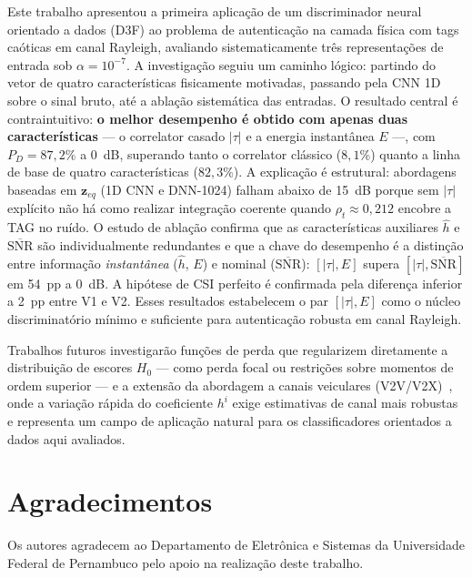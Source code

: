 \documentclass{sbrt}
\begin{document}
Este trabalho apresentou a primeira aplicação de um discriminador neural orientado a dados (D3F) ao problema de autenticação na camada física com tags caóticas em canal Rayleigh, avaliando sistematicamente três representações de entrada sob $\alpha = 10^{-7}$. A investigação seguiu um caminho lógico: partindo do vetor de quatro características fisicamente motivadas, passando pela CNN 1D sobre o sinal bruto, até a ablação sistemática das entradas. O resultado central é contraintuitivo: \textbf{o melhor desempenho é obtido com apenas duas características} — o correlator casado $|\tau|$ e a energia instantânea $E$ —, com $P_D = 87{,}2\%$ a 0~dB, superando tanto o correlator clássico ($8{,}1\%$) quanto a linha de base de quatro características ($82{,}3\%$). A explicação é estrutural: abordagens baseadas em $\mathbf{z}_{eq}$ (1D CNN e DNN-1024) falham abaixo de 15~dB porque sem $|\tau|$ explícito não há como realizar integração coerente quando $\rho_t \approx 0{,}212$ encobre a TAG no ruído. O estudo de ablação confirma que as características auxiliares $\hat{h}$ e $\overline{\text{SNR}}$ são individualmente redundantes e que a chave do desempenho é a distinção entre informação \emph{instantânea} ($\hat{h}$, $E$) e nominal ($\overline{\text{SNR}}$): $[|\tau|, E]$ supera $[|\tau|, \overline{\text{SNR}}]$ em 54~pp a 0~dB. A hipótese de CSI perfeito é confirmada pela diferença inferior a 2~pp entre V1 e V2. Esses resultados estabelecem o par $[|\tau|, E]$ como o núcleo discriminatório mínimo e suficiente para autenticação robusta em canal Rayleigh.

Trabalhos futuros investigarão funções de perda que regularizem diretamente a distribuição de escores $H_0$ — como perda focal ou restrições sobre momentos de ordem superior — e a extensão da abordagem a canais veiculares (V2V/V2X)~\cite{ref_3gpp}, onde a variação rápida do coeficiente $h^i$ exige estimativas de canal mais robustas e representa um campo de aplicação natural para os classificadores orientados a dados aqui avaliados.

\section*{Agradecimentos}
Os autores agradecem ao Departamento de Eletrônica e Sistemas da Universidade Federal de Pernambuco pelo apoio na realização deste trabalho.
\end{document}
